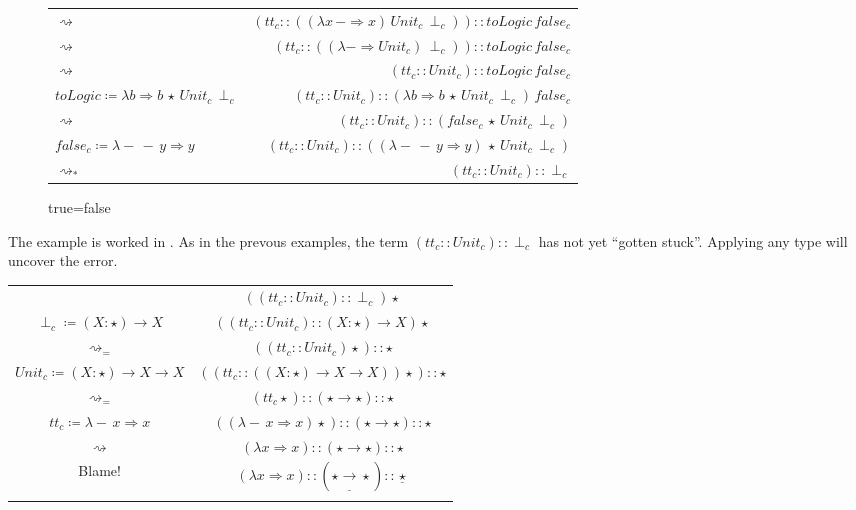 \begin{sidewaysfigure}
\begin{tabular}{lr}
$\rightsquigarrow$ & $\left(tt_{c}::\left(\left(\lambda x\,-\Rightarrow x\right)\,Unit_{c}\,\perp_{c}\right)\right)::toLogic\,false_{c}$\tabularnewline
$\rightsquigarrow$ & $\left(tt_{c}::\left(\left(\lambda-\Rightarrow Unit_{c}\right)\,\perp_{c}\right)\right)::toLogic\,false_{c}$\tabularnewline
$\rightsquigarrow$ & $\left(tt_{c}::Unit_{c}\right)::toLogic\,false_{c}$\tabularnewline
$toLogic\coloneqq\lambda b\Rightarrow b\,\star\,Unit_{c}\,\perp_{c}$ & $\left(tt_{c}::Unit_{c}\right)::\left(\lambda b\Rightarrow b\,\star\,Unit_{c}\,\perp_{c}\right)\,false_{c}$\tabularnewline
$\rightsquigarrow$ & $\left(tt_{c}::Unit_{c}\right)::\left(false_{c}\,\star\,Unit_{c}\,\perp_{c}\right)$\tabularnewline
$false_{c}\coloneqq\lambda-\,-\,y\Rightarrow y$ & $\left(tt_{c}::Unit_{c}\right)::\left(\left(\lambda-\,-\,y\Rightarrow y\right)\,\star\,Unit_{c}\,\perp_{c}\right)$\tabularnewline
$\rightsquigarrow_{*}$ & $\left(tt_{c}::Unit_{c}\right)::\perp_{c}$\tabularnewline
\end{tabular}
\caption{true=false}
\label{fig:cast-ex-tf}
\end{sidewaysfigure}

The example is worked in .
As in the prevous examples, the term $\left(tt_{c}::Unit_{c}\right)::\perp_{c}$ has not yet ``gotten stuck''.
Applying any type will uncover the error.

\begin{tabular}{cc}
 & $\left(\left(tt_{c}::Unit_{c}\right)::\perp_{c}\right)\star$\tabularnewline
$\perp_{c}\coloneqq\left(X:\star\right)\rightarrow X$ & $\left(\left(tt_{c}::Unit_{c}\right)::\left(X:\star\right)\rightarrow X\right)\star$\tabularnewline
$\rightsquigarrow_{=}$ & $\left(\left(tt_{c}::Unit_{c}\right)\star\right)::\star$\tabularnewline
$Unit_{c}\coloneqq\left(X:\star\right)\rightarrow X\rightarrow X$ & $\left(\left(tt_{c}::\left(\left(X:\star\right)\rightarrow X\rightarrow X\right)\right)\star\right)::\star$\tabularnewline
$\rightsquigarrow_{=}$ & $\left(tt_{c}\star\right)::\left(\star\rightarrow\star\right)::\star$\tabularnewline
$tt_{c}\coloneqq\lambda-\,x\Rightarrow x$ & $\left(\left(\lambda-\,x\Rightarrow x\right)\star\right)::\left(\star\rightarrow\star\right)::\star$\tabularnewline
$\rightsquigarrow$ & $\left(\lambda x\Rightarrow x\right)::\left(\star\rightarrow\star\right)::\star$\tabularnewline
Blame! & $\left(\lambda x\Rightarrow x\right)::\left(\star\underline{\rightarrow}\star\right)::\underline{\star}$\tabularnewline
 & \tabularnewline
\end{tabular}

